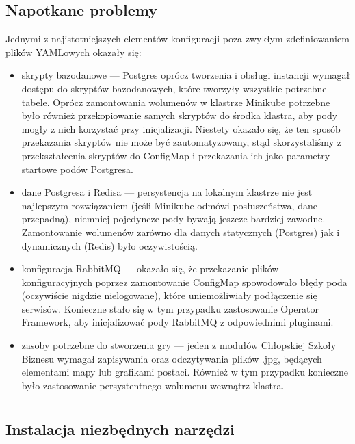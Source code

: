 \documentclass[polish]{aghengthesis}
\begin{document}
\section{Napotkane problemy}
\par Jednymi z najistotniejszych elementów konfiguracji poza zwykłym zdefiniowaniem plików YAMLowych okazały się:
\begin{itemize}
    \item skrypty bazodanowe — Postgres oprócz tworzenia i obsługi instancji wymagał dostępu do skryptów bazodanowych, które tworzyły wszystkie potrzebne tabele. Oprócz zamontowania wolumenów w klastrze Minikube potrzebne było również przekopiowanie samych skryptów do środka klastra, aby pody mogły z nich korzystać przy inicjalizacji. Niestety okazało się, że ten sposób przekazania skryptów nie może być zautomatyzowany, stąd skorzystaliśmy z przekształcenia skryptów do ConfigMap i przekazania ich jako parametry startowe podów Postgresa.
    \item dane Postgresa i Redisa — persystencja na lokalnym klastrze nie jest najlepszym rozwiązaniem (jeśli Minikube odmówi posłuszeństwa, dane przepadną), niemniej pojedyncze pody bywają jeszcze bardziej zawodne. Zamontowanie wolumenów zarówno dla danych statycznych (Postgres) jak i dynamicznych (Redis) było oczywistością.
    \item konfiguracja RabbitMQ — okazało się, że przekazanie plików konfiguracyjnych poprzez zamontowanie ConfigMap spowodowało błędy poda (oczywiście nigdzie nielogowane), które uniemożliwiały podłączenie się serwisów. Konieczne stało się w tym przypadku zastosowanie Operator Framework, aby inicjalizować pody RabbitMQ z odpowiednimi pluginami.
    \item zasoby potrzebne do stworzenia gry — jeden z modułów Chłopskiej Szkoły Biznesu wymagał zapisywania oraz odczytywania plików .jpg, będących elementami mapy lub grafikami postaci. Również w tym przypadku konieczne było zastosowanie persystentnego wolumenu wewnątrz klastra.
\end{itemize}

\chapter{\ChapterTitleInstallMethod} \label{sec:instalacja}

\section{Instalacja niezbędnych narzędzi}
\end{document}
